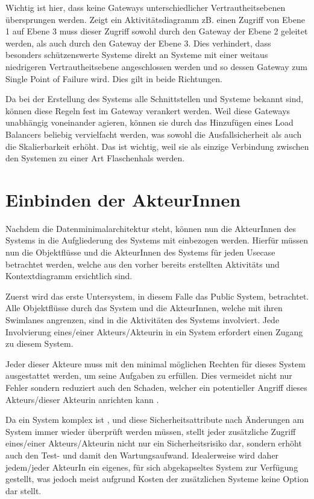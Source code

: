Wichtig ist hier, dass keine Gateways unterschiedlicher Vertrautheitsebenen übersprungen werden. Zeigt ein Aktivitätsdiagramm zB. einen Zugriff von Ebene 1 auf Ebene 3 muss dieser Zugriff sowohl durch den Gateway der Ebene 2 geleitet werden, als auch durch den Gateway der Ebene 3. Dies verhindert, dass besonders schützenswerte Systeme direkt an Systeme mit einer weitaus niedrigeren Vertrautheitsebene angeschlossen werden und so dessen Gateway zum Single Point of Failure wird. Dies gilt in beide Richtungen.

Da bei der Erstellung des Systems alle Schnittstellen und Systeme bekannt sind, können diese Regeln fest im Gateway verankert werden. Weil diese Gateways unabhängig voneinander agieren, können sie durch das Hinzufügen eines Load Balancers beliebig vervielfacht werden, was sowohl die Ausfallsicherheit als auch die Skalierbarkeit erhöht. Das ist wichtig, weil sie als einzige Verbindung zwischen den Systemen zu einer Art Flaschenhals werden.

\section{Einbinden der AkteurInnen}
Nachdem die Datenminimalarchitektur steht, können nun die AkteurInnen des Systems in die Aufgliederung des Systems mit einbezogen werden. Hierfür müssen nun die Objektflüsse und die AkteurInnen des Systems für jeden Usecase betrachtet werden, welche aus den vorher bereits erstellten Aktivitäts und Kontextdiagramm ersichtlich sind.

Zuerst wird das erste Untersystem, in diesem Falle das Public System, betrachtet. Alle Objektflüsse durch das System und die AkteurInnen, welche mit ihren Swimlanes angrenzen, sind in die Aktivitäten des Systems involviert. Jede Involvierung eines/einer Akteurs/Akteurin in ein System erfordert einen Zugang zu diesem System.

Jeder dieser Akteure muss mit den minimal möglichen Rechten für dieses System ausgestattet werden, um seine Aufgaben zu erfüllen. Dies vermeidet nicht nur Fehler sondern reduziert auch den Schaden, welcher ein potentieller Angriff dieses Akteurs/dieser Akteurin anrichten kann \cite[1. A]{leastpriv}.

Da ein System komplex ist \cite[S. 7]{softarch}, und diese Sicherheitsattribute nach Änderungen am System immer wieder überprüft werden müssen, stellt jeder zusätzliche Zugriff eines/einer Akteurs/Akteurin nicht nur ein Sicherheitsrisiko dar, sondern erhöht auch den Test- und damit den Wartungsaufwand. Idealerweise wird daher jedem/jeder AkteurIn ein eigenes, für sich abgekapseltes System zur Verfügung gestellt, was jedoch meist aufgrund Kosten der zusätzlichen Systeme keine Option dar stellt.


